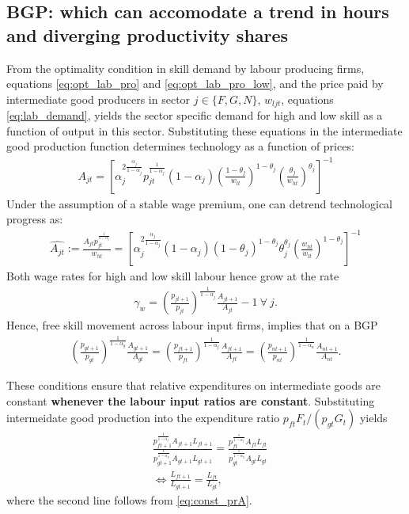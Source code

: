 \subsection{BGP: which can accomodate a trend in hours and diverging productivity shares}
\textbf{}
From the optimality condition in skill demand by labour producing firms, equations \ref{eq:opt_lab_pro} and \ref{eq:opt_lab_pro_low}, and the price paid by intermediate good producers in sector $j\in\{F, G, N\}$, $w_{ljt}$, equations \ref{eq:lab_demand}, yields the sector specific demand for high and low skill as a function of output in this sector. Substituting these equations in the intermediate good production function determines technology as a function of prices:
\begin{align}
A_{jt} = \left[\alpha_j^{2\frac{\alpha_j}{1-\alpha_j}}p_{jt}^\frac{1}{1-\alpha_j}(1-\alpha_j)\left(\frac{1-\theta_j}{w_{lt}}\right)^{1-\theta_j}\left(\frac{\theta_j}{w_{ht}}\right)^{\theta_j}\right] ^{-1}
\end{align}
Under the assumption of a stable wage premium, one can detrend technological progress as:
\begin{align}
\hat{A_{jt}}:=\frac{A_{jt}p_{jt}^\frac{1}{1-\alpha_j}}{w_{ht}}= \left[\alpha_j^{2\frac{\alpha_j}{1-\alpha_j}}(1-\alpha_j)\left(1-\theta_j\right)^{1-\theta_j}\theta_j^{\theta_j}\left(\frac{w_{ht}}{w_{lt}}\right)^{1-\theta_j}\right] ^{-1}\label{eq:A_det}
\end{align}
Both wage rates for high and low skill labour hence grow at the rate
\begin{align}
\gamma_{w}=\left(\frac{p_{jt+1}}{p_{jt}}\right)^\frac{1}{1-\alpha_j}\frac{A_{jt+1}}{A_{jt}}-1  \ \forall \ j. 
\end{align}
Hence, free skill movement across labour input firms, implies that on a BGP
\begin{align}
\left(\frac{p_{gt+1}}{p_{gt}}\right)^\frac{1}{1-\alpha_g}\frac{A_{gt+1}}{A_{gt}}=\left(\frac{p_{ft+1}}{p_{ft}}\right)^\frac{1}{1-\alpha_f}\frac{A_{ft+1}}{A_{ft}}=\left(\frac{p_{nt+1}}{p_{nt}}\right)^\frac{1}{1-\alpha_n}\frac{A_{nt+1}}{A_{nt}}. \label{eq:const_prA} 
\end{align}

These conditions ensure that relative expenditures on intermediate goods are constant \textbf{whenever the labour input ratios are constant}. Substituting intermeidate good production into the expenditure ratio $p_{ft}F_t/(p_{gt}G_t)$  yields
\begin{align}
&\frac{p_{ft+1}^\frac{1}{1-\alpha_f}A_{ft+1}L_{ft+1}}{p_{gt+1}^\frac{1}{1-\alpha_g}A_{gt+1}L_{gt+1}}= \frac{p_{ft}^\frac{1}{1-\alpha_f}A_{ft}L_{ft}}{p_{gt}^\frac{1}{1-\alpha_g}A_{gt}L_{gt}}\\
&\Leftrightarrow \frac{L_{ft+1}}{L_{gt+1}}=\frac{L_{ft}}{L_{gt}},
\end{align}
where the second line follows from \ref{eq:const_prA}. 


